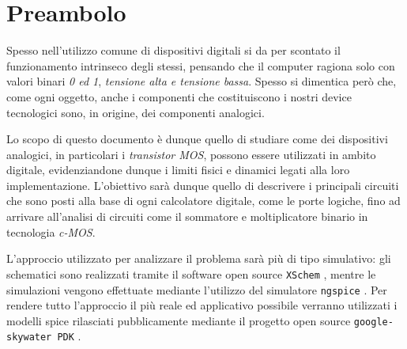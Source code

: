 \chapter{Preambolo}
	Spesso nell'utilizzo comune di dispositivi digitali si da per scontato il funzionamento intrinseco degli stessi, pensando che il computer ragiona solo con valori binari \textit{0 ed 1}, \textit{tensione alta e tensione bassa}. Spesso si dimentica però che, come ogni oggetto, anche i componenti che costituiscono i nostri device tecnologici sono, in origine, dei componenti analogici.
	
	Lo scopo di questo documento è dunque quello di studiare come dei dispositivi analogici, in particolari i \textit{transistor MOS}, possono essere utilizzati in ambito digitale, evidenziandone dunque i limiti fisici e dinamici legati alla loro implementazione. L'obiettivo sarà dunque quello di descrivere i principali circuiti che sono posti alla base di ogni calcolatore digitale, come le porte logiche, fino ad arrivare all'analisi di circuiti come il sommatore e moltiplicatore binario in tecnologia \textit{c-MOS}.
	
	L'approccio utilizzato per analizzare il problema sarà più di tipo simulativo: gli schematici sono realizzati tramite il software open source \texttt{XSchem} \cite{xschem}, mentre le simulazioni vengono effettuate mediante l'utilizzo del simulatore \texttt{ngspice} \cite{ngspice}. Per rendere tutto l'approccio il più reale ed applicativo possibile verranno utilizzati i modelli spice rilasciati pubblicamente mediante il progetto open source \texttt{google-skywater PDK} \cite{skywater}.